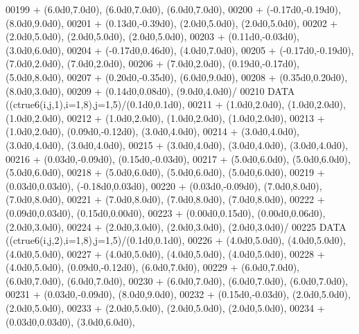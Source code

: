 \begin{DoxyCode}
00199      +                  (6.0d0,7.0d0), (6.0d0,7.0d0), (6.0d0,7.0d0),
00200      +                  (-0.17d0,-0.19d0), (8.0d0,9.0d0),
00201      +                  (0.13d0,-0.39d0), (2.0d0,5.0d0), (2.0d0,5.0d0),
00202      +                  (2.0d0,5.0d0), (2.0d0,5.0d0), (2.0d0,5.0d0),
00203      +                  (0.11d0,-0.03d0), (3.0d0,6.0d0),
00204      +                  (-0.17d0,0.46d0), (4.0d0,7.0d0),
00205      +                  (-0.17d0,-0.19d0), (7.0d0,2.0d0), (7.0d0,2.0d0),
00206      +                  (7.0d0,2.0d0), (0.19d0,-0.17d0), (5.0d0,8.0d0),
00207      +                  (0.20d0,-0.35d0), (6.0d0,9.0d0),
00208      +                  (0.35d0,0.20d0), (8.0d0,3.0d0),
00209      +                  (0.14d0,0.08d0), (9.0d0,4.0d0)/
00210       \textcolor{keyword}{DATA}              ((ctrue6(i,j,1),i=1,8),j=1,5)/(0.1d0,0.1d0),
00211      +                  (1.0d0,2.0d0), (1.0d0,2.0d0), (1.0d0,2.0d0),
00212      +                  (1.0d0,2.0d0), (1.0d0,2.0d0), (1.0d0,2.0d0),
00213      +                  (1.0d0,2.0d0), (0.09d0,-0.12d0), (3.0d0,4.0d0),
00214      +                  (3.0d0,4.0d0), (3.0d0,4.0d0), (3.0d0,4.0d0),
00215      +                  (3.0d0,4.0d0), (3.0d0,4.0d0), (3.0d0,4.0d0),
00216      +                  (0.03d0,-0.09d0), (0.15d0,-0.03d0),
00217      +                  (5.0d0,6.0d0), (5.0d0,6.0d0), (5.0d0,6.0d0),
00218      +                  (5.0d0,6.0d0), (5.0d0,6.0d0), (5.0d0,6.0d0),
00219      +                  (0.03d0,0.03d0), (-0.18d0,0.03d0),
00220      +                  (0.03d0,-0.09d0), (7.0d0,8.0d0), (7.0d0,8.0d0),
00221      +                  (7.0d0,8.0d0), (7.0d0,8.0d0), (7.0d0,8.0d0),
00222      +                  (0.09d0,0.03d0), (0.15d0,0.00d0),
00223      +                  (0.00d0,0.15d0), (0.00d0,0.06d0), (2.0d0,3.0d0),
00224      +                  (2.0d0,3.0d0), (2.0d0,3.0d0), (2.0d0,3.0d0)/
00225       \textcolor{keyword}{DATA}              ((ctrue6(i,j,2),i=1,8),j=1,5)/(0.1d0,0.1d0),
00226      +                  (4.0d0,5.0d0), (4.0d0,5.0d0), (4.0d0,5.0d0),
00227      +                  (4.0d0,5.0d0), (4.0d0,5.0d0), (4.0d0,5.0d0),
00228      +                  (4.0d0,5.0d0), (0.09d0,-0.12d0), (6.0d0,7.0d0),
00229      +                  (6.0d0,7.0d0), (6.0d0,7.0d0), (6.0d0,7.0d0),
00230      +                  (6.0d0,7.0d0), (6.0d0,7.0d0), (6.0d0,7.0d0),
00231      +                  (0.03d0,-0.09d0), (8.0d0,9.0d0),
00232      +                  (0.15d0,-0.03d0), (2.0d0,5.0d0), (2.0d0,5.0d0),
00233      +                  (2.0d0,5.0d0), (2.0d0,5.0d0), (2.0d0,5.0d0),
00234      +                  (0.03d0,0.03d0), (3.0d0,6.0d0),

\end{DoxyCode}

